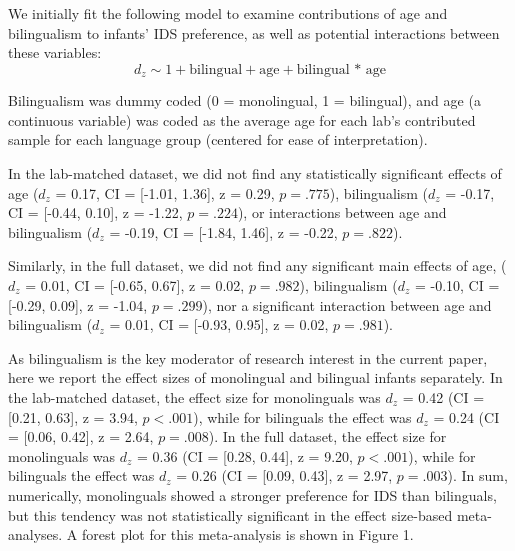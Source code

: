 \documentclass[
  english,
  ,man,floatsintext]{apa6}
\begin{document}
We initially fit the following model to examine contributions of age and bilingualism to infants' IDS preference, as well as potential interactions between these variables: \[d_z \sim 1 + \text{bilingual} + \text{age} + \text{bilingual * age}\]

Bilingualism was dummy coded (0 = monolingual, 1 = bilingual), and age (a continuous variable) was coded as the average age for each lab's contributed sample for each language group (centered for ease of interpretation).

In the lab-matched dataset, we did not find any statistically significant effects of age (\(d_z\) = 0.17, CI = {[}-1.01, 1.36{]}, z = 0.29, \(p = .775\)), bilingualism (\(d_z\) =
-0.17, CI = {[}-0.44, 0.10{]}, z = -1.22, \(p = .224\)), or interactions between age and bilingualism (\(d_z\) = -0.19, CI = {[}-1.84, 1.46{]}, z = -0.22, \(p = .822\)).

Similarly, in the full dataset, we did not find any significant main effects of age, (\(d_z\) = 0.01, CI = {[}-0.65, 0.67{]}, z = 0.02, \(p = .982\)),
bilingualism (\(d_z\) = -0.10, CI = {[}-0.29, 0.09{]}, z = -1.04, \(p = .299\)), nor a significant interaction between age and bilingualism (\(d_z\) = 0.01, CI = {[}-0.93, 0.95{]}, z = 0.02, \(p = .981\)).

As bilingualism is the key moderator of research interest in the current paper, here we report the effect sizes of monolingual and bilingual infants separately. In the lab-matched dataset, the effect size for monolinguals was \(d_z\) = 0.42 (CI = {[}0.21, 0.63{]}, z = 3.94, \(p < .001\)), while for bilinguals the effect was \(d_z\) = 0.24 (CI = {[}0.06, 0.42{]}, z = 2.64, \(p = .008\)). In the full dataset, the effect size for monolinguals was \(d_z\) = 0.36 (CI = {[}0.28, 0.44{]}, z = 9.20, \(p < .001\)), while for bilinguals the effect was \(d_z\) = 0.26 (CI = {[}0.09, 0.43{]}, z = 2.97, \(p = .003\)). In sum, numerically, monolinguals showed a stronger preference for IDS than bilinguals, but this tendency was not statistically significant in the effect size-based meta-analyses. A forest plot for this meta-analysis is shown in Figure 1.
\end{document}
